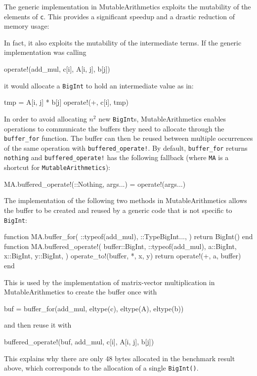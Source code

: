 \documentclass{juliacon}
\newcommand{\ma}{MutableArithmetics}
\begin{document}
The generic implementation in \ma{} exploits the mutability of the elements of \lstinline|c|.
This provides a significant speedup and a drastic reduction of memory usage:

In fact, it also exploits the mutability of the intermediate terms.
If the generic implementation was calling
\begin{jllisting}
operate!(add_mul, c[i], A[i, j], b[j])
\end{jllisting}
it would allocate a \lstinline|BigInt| to hold an intermediate value as in:
\begin{jllisting}
tmp = A[i, j] * b[j]
operate!(+, c[i], tmp)
\end{jllisting}
In order to avoid allocating $n^2$ new \lstinline|BigInt|s,
\ma{} enables operations to communicate the buffers they need to allocate through the \lstinline|buffer_for| function.
The buffer can then be reused between multiple occurrences of the same operation with \lstinline|buffered_operate!|.
By default, \lstinline|buffer_for| returns \lstinline|nothing|
and \lstinline|buffered_operate!| has the following fallback (where \lstinline|MA| is a shortcut for \lstinline|MutableArithmetics|):
\begin{jllisting}
MA.buffered_operate!(::Nothing, args...) = operate!(args...)
\end{jllisting}
The implementation of the following two methods in MutableArithmetics
allows the buffer to be created and reused by a generic code that is not
specific to \lstinline|BigInt|:
\begin{jllisting}
function MA.buffer_for(
    ::typeof(add_mul),
    ::Type{BigInt}...,
)
    return BigInt()
end
function MA.buffered_operate!(
    buffer::BigInt,
    ::typeof(add_mul),
    a::BigInt,
    x::BigInt,
    y::BigInt,
)
    operate_to!(buffer, *, x, y)
    return operate!(+, a, buffer)
end
\end{jllisting}
This is used by the implementation of matrix-vector
multiplication in MutableArithmetics to create the
buffer once with
\begin{jllisting}
buf = buffer_for(add_mul, eltype(c), eltype(A), eltype(b))
\end{jllisting}
and then reuse it with
\begin{jllisting}
buffered_operate!(buf, add_mul, c[i], A[i, j], b[j])
\end{jllisting}
This explains why there are only 48 bytes allocated in the benchmark result above,
which corresponds to the allocation of a single \lstinline|BigInt()|.
\end{document}
